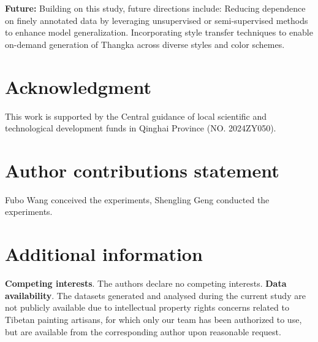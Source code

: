\documentclass[sn-mathphys]{sn-jnl}%
\theoremstyle{thmstyleone}%
\theoremstyle{thmstyletwo}%
\theoremstyle{thmstylethree}%
\begin{document}
\textbf{Future: } Building on this study, future directions include: Reducing dependence on finely annotated data by leveraging unsupervised or semi-supervised methods to enhance model generalization. Incorporating style transfer techniques to enable on-demand generation of Thangka across diverse styles and color schemes.  
\section{Acknowledgment}
This work is supported by the Central guidance of local scientific and technological development funds in Qinghai Province (NO. 2024ZY050).

\section{Author contributions statement}

Fubo Wang conceived the experiments,  Shengling Geng conducted the experiments.

\section{Additional information}

\textbf{Competing interests}. The authors declare no competing interests. \textbf{Data availability}. The datasets generated and analysed during the current study are not publicly available due to intellectual property rights concerns related to Tibetan painting artisans, for which only our team has been authorized to use, but are available from the corresponding author upon reasonable request.
\end{document}
